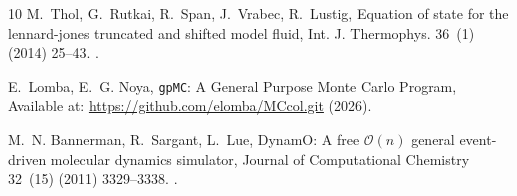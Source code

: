 \documentclass[final,5p,times,twocolumn]{elsarticle}
\begin{document}
\begin{thebibliography}{10}
M.~Thol, G.~Rutkai, R.~Span, J.~Vrabec, R.~Lustig, Equation of state for the
  lennard-jones truncated and shifted model fluid, Int. J. Thermophys. 36~(1)
  (2014) 25--43.
\newblock \href {https://doi.org/10.1007/s10765-014-1764-4}
  {}.

E.~Lomba, E.~G. Noya, {\texttt{gpMC}: A General Purpose Monte Carlo Program},
  Available at: \url{https://github.com/elomba/MCcol.git} (2026).

M.~N. Bannerman, R.~Sargant, L.~Lue, {DynamO}: A free $\mathcal{O}(n)$ general
  event-driven molecular dynamics simulator, Journal of Computational Chemistry
  32~(15) (2011) 3329--3338.
\newblock \href {https://doi.org/10.1002/jcc.21915}
  {}.

\end{thebibliography}
\end{document}
